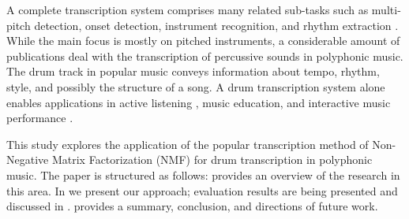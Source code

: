 \documentclass{article}
\begin{document}

A complete transcription system comprises many related sub-tasks such as multi-pitch detection, onset detection, instrument recognition, and rhythm extraction \cite{benetos_automatic_2013}. While the main focus is mostly on pitched instruments, a considerable amount of publications deal with the transcription of percussive sounds in polyphonic music. The drum track in popular music conveys information about tempo, rhythm, style, and possibly the structure of a song. A drum transcription system alone enables applications in active listening \cite{yoshii_drumix:_2007}, music education, and interactive music performance \cite{weinberg_interactive_2009}.


This study explores the application of the popular transcription method of Non-Negative Matrix Factorization (NMF) for drum transcription in polyphonic music. The paper is structured as follows:  provides an overview of the research in this area. In  we present our approach; evaluation results are being presented and discussed in .  provides a summary, conclusion, and directions of future work.

\end{document}
